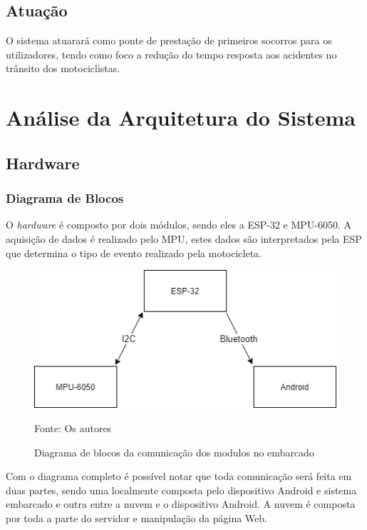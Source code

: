 \subsection{\textbf{Atuação}}

O sistema atuarará como ponte de prestação de primeiros socorros para os utilizadores, tendo como foco a redução do tempo resposta aos acidentes no trânsito dos motociclistas.


\section{Análise da Arquitetura do Sistema}
\subsection{\textbf{Hardware}}
\subsubsection{Diagrama de Blocos}

O \textit{hardware} é composto por dois módulos, sendo eles a ESP-32 e MPU-6050. A aquisição de dados é realizado pelo MPU, estes dados são interpretados pela ESP que determina o tipo de evento realizado pela motocicleta. 


\begin{figure}[H]

    \caption{Diagrama de blocos da comunicação dos modulos no embarcado}
      \begin{center}
          
      
    \includegraphics[width=120mm]{images/Cap3/Diagrama_hardware.png}
    \end{center}
         Fonte: Os autores
\end{figure}





Com o diagrama completo é possível notar que toda comunicação será feita em duas partes, sendo uma localmente composta pelo dispositivo Android e sistema embarcado e outra entre a nuvem e o dispositivo Android. A nuvem é composta por toda a parte do servidor e manipulação da página Web.

